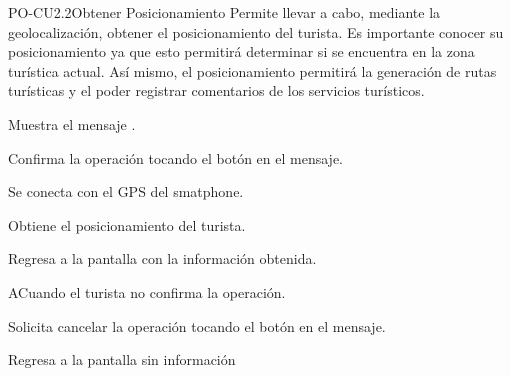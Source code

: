 
% 



	\begin{UseCase}{PO-CU2.2}{Obtener Posicionamiento}{
		Permite llevar a cabo, mediante la geolocalización, obtener el posicionamiento del turista. Es importante conocer su posicionamiento ya que esto permitirá determinar si se encuentra en la zona turística actual. Así mismo, el posicionamiento permitirá la generación de rutas turísticas y el poder registrar comentarios de los servicios turísticos.
	}
	\end{UseCase}
	\begin{UCtrayectoria}
		 
		\UCpaso Muestra el mensaje .
		
		\UCpaso [\UCactor] Confirma la operación tocando el botón  en el mensaje. 
		
		\UCpaso Se conecta con el GPS del smatphone.
		
		\UCpaso Obtiene el posicionamiento del turista.
		
		\UCpaso Regresa a la pantalla  con la información obtenida. 
		
	\end{UCtrayectoria}

	\begin{UCtrayectoriaA}{A}{Cuando el turista no confirma la operación.}
		
		\UCpaso [\UCactor] Solicita cancelar la operación tocando el botón  en el mensaje.
		
		\UCpaso Regresa a la pantalla  sin información
		
	\end{UCtrayectoriaA}
